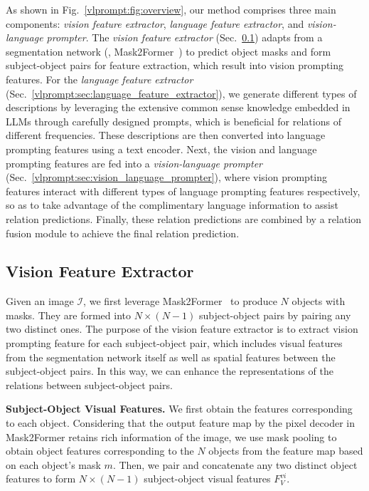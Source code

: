 As shown in Fig.~\ref{vlprompt:fig:overview}, our method comprises three main components: \textit{vision feature extractor}, \textit{language feature extractor}, and \textit{vision-language prompter}.
The \textit{vision feature extractor} (Sec.~\ref{vlprompt:sec:vision_feature_extractor}) adapts from a segmentation network (\eg, Mask2Former~\citep{cheng2022masked}) to predict object masks and form subject-object pairs for feature extraction, which result into vision prompting features.
For the \textit{language feature extractor} (Sec.~\ref{vlprompt:sec:language_feature_extractor}), we generate different types of descriptions by leveraging the extensive common sense knowledge embedded in LLMs through carefully designed prompts, which is beneficial for relations of different frequencies.
These descriptions are then converted into language prompting features using a text encoder.
Next, the vision and language prompting features are fed into a \textit{vision-language prompter} (Sec.~\ref{vlprompt:sec:vision_language_prompter}), where vision prompting features interact with different types of language prompting features respectively, so as to take advantage of the complimentary language information to assist relation predictions. 
Finally, these relation predictions are combined by a relation fusion module to achieve the final relation prediction.


\subsection{Vision Feature Extractor}
\label{vlprompt:sec:vision_feature_extractor}

Given an image $\mathcal{I}$, we first leverage Mask2Former~\citep{cheng2022masked} to produce $N$ objects with masks.
They are formed into $N \times (N-1)$ subject-object pairs by pairing any two distinct ones. 
The purpose of the vision feature extractor is to extract vision prompting feature for each subject-object pair, which includes visual features from the segmentation network itself as well as spatial features between the subject-object pairs.
In this way, we can enhance the representations of the relations between subject-object pairs.  

\noindent \textbf{Subject-Object Visual Features.}
We first obtain the features corresponding to each object.
Considering that the output feature map by the pixel decoder in Mask2Former retains rich information of the image, we use mask pooling to obtain object features corresponding to the $N$ objects from the feature map based on each object's mask $m$.
Then, we pair and concatenate any two distinct object features to form $N \times (N-1)$ subject-object visual features $F_{V}^{vi}$.

